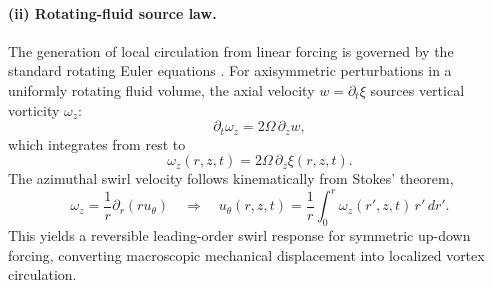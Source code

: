\documentclass[11pt,a4paper]{article}
\begin{document}
        \paragraph{(ii) Rotating-fluid source law.} The generation of local circulation from linear forcing is governed by the standard rotating Euler equations \cite{Greenspan1968, Batchelor1967}. For axisymmetric perturbations in a uniformly rotating fluid volume, the axial velocity $w = \partial_t \xi$ sources vertical vorticity $\omega_z$:
            \begin{equation}
                \label{eq:wz}
                \partial_t \omega_z = 2\Omega\,\partial_z w,
            \end{equation}
            which integrates from rest to
            \begin{equation}
                \label{eq:wzxi}
                \omega_z(r,z,t)=2\Omega\,\partial_z \xi(r,z,t).
            \end{equation}
            The azimuthal swirl velocity follows kinematically from Stokes' theorem,
            \begin{equation}
                \label{eq:utheta}
                \omega_z = \frac{1}{r}\partial_r(r u_\theta)
                \quad\Longrightarrow\quad
                u_\theta(r,z,t)=\frac{1}{r}\int_0^r \omega_z(r',z,t)\,r'\,dr'.
            \end{equation}
            This yields a reversible leading-order swirl response for symmetric up-down forcing, converting macroscopic mechanical displacement into localized vortex circulation.
        
\end{document}
